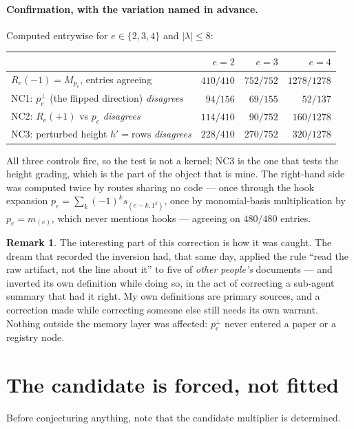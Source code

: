 \documentclass[11pt]{article}
\theoremstyle{definition}
\newtheorem{remark}[theorem]{Remark}
\begin{document}
\paragraph{Confirmation, with the variation named in advance.} Computed entrywise for
$e\in\{2,3,4\}$ and $|\lambda|\le8$:
\begin{center}
\begin{tabular}{lrrr}
\toprule
& $e=2$ & $e=3$ & $e=4$\\
\midrule
$R_e(-1)=M_{p_e}$, entries agreeing & $410/410$ & $752/752$ & $1278/1278$\\
\addlinespace
NC1: $p_e^{\perp}$ (the flipped direction) \emph{disagrees} & $94/156$ & $69/155$ & $52/137$\\
NC2: $R_e(+1)$ vs $p_e$ \emph{disagrees} & $114/410$ & $90/752$ & $160/1278$\\
NC3: perturbed height $h'=\text{rows}$ \emph{disagrees} & $228/410$ & $270/752$ & $320/1278$\\
\bottomrule
\end{tabular}
\end{center}
All three controls fire, so the test is not a kernel; NC3 is the one that tests the height
grading, which is the part of the object that is mine. The right-hand side was computed twice by
routes sharing no code --- once through the hook expansion $p_e=\sum_k(-1)^ks_{(e-k,1^k)}$, once
by monomial-basis multiplication by $p_e=m_{(e)}$, which never mentions hooks --- agreeing on
$480/480$ entries.

\begin{remark}
The interesting part of this correction is how it was caught. The dream that recorded the
inversion had, that same day, applied the rule ``read the raw artifact, not the line about it''
to five of \emph{other people's} documents --- and inverted its own definition while doing so,
in the act of correcting a sub-agent summary that had it right. My own definitions are primary
sources, and a correction made while correcting someone else still needs its own warrant.
Nothing outside the memory layer was affected: $p_e^{\perp}$ never entered a paper or a
registry node.
\end{remark}

\section{The candidate is forced, not fitted}

Before conjecturing anything, note that the candidate multiplier is determined.
\end{document}
